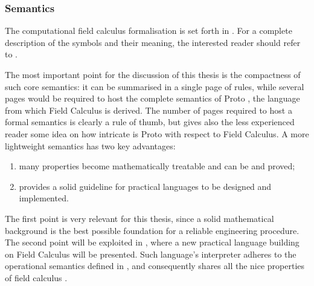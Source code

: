 \documentclass[12pt,a4paper,twoside,openright]{book}
\begin{document}
\subsubsection{Semantics}

The computational field calculus formalisation is set forth in .
%
For a complete description of the symbols and their meaning, the interested reader should refer to \cite{VDB-FOCLASA-CIC2013}.

The most important point for the discussion of this thesis is the compactness of such core semantics: it can be summarised in a single page of rules, while several pages would be required to host the complete semantics of Proto \cite{spatialcomputing-sac11,spatialcomputing-scp78}, the language from which Field Calculus is derived.
%
The number of pages required to host a formal semantics is clearly a rule of thumb, but gives also the less experienced reader some idea on how intricate is Proto with respect to Field Calculus.
%
A more lightweight semantics has two key advantages:
\begin{enumerate}
 \item many properties become mathematically treatable and can be and proved;
 \item provides a solid guideline for practical languages to be designed and implemented.
\end{enumerate}
%
The first point is very relevant for this thesis, since a solid mathematical background is the best possible foundation for a reliable engineering procedure.
%
The second point will be exploited in , where a new practical language building on Field Calculus will be presented.
%
Such language's interpreter adheres to the operational semantics defined in , and consequently shares all the nice properties of field calculus \cite{VDB-FOCLASA-CIC2013}.

%
\end{document}
